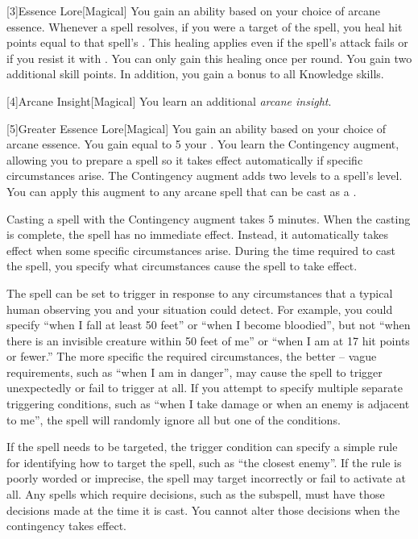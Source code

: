         [3]{Essence Lore}[Magical]
        You gain an ability based on your choice of arcane essence.
         Whenever a spell resolves, if you were a target of the spell, you heal hit points equal to that spell's .
        This healing applies even if the spell's attack fails or if you resist it with .
        You can only gain this healing once per round.
         You gain two additional skill points.
        In addition, you gain a  bonus to all Knowledge skills.

        [4]{Arcane Insight}[Magical]
        You learn an additional \textit{arcane insight}.

        [5]{Greater Essence Lore}[Magical]
        You gain an ability based on your choice of arcane essence.
         You gain  equal to 5 \add your .
         You learn the Contingency augment, allowing you to prepare a spell so it takes effect automatically if specific circumstances arise.
        The Contingency augment adds two levels to a spell's level.
        You can apply this augment to any arcane spell that can be cast as a .

        Casting a spell with the Contingency augment takes 5 minutes.
        When the casting is complete, the spell has no immediate effect.
        Instead, it automatically takes effect when some specific circumstances arise.
        During the time required to cast the spell, you specify what circumstances cause the spell to take effect.

        The spell can be set to trigger in response to any circumstances that a typical human observing you and your situation could detect.
        For example, you could specify ``when I fall at least 50 feet'' or ``when I become bloodied'', but not ``when there is an invisible creature within 50 feet of me'' or ``when I am at 17 hit points or fewer.''
        The more specific the required circumstances, the better -- vague requirements, such as ``when I am in danger'', may cause the spell to trigger unexpectedly or fail to trigger at all.
        If you attempt to specify multiple separate triggering conditions, such as ``when I take damage or when an enemy is adjacent to me'', the spell will randomly ignore all but one of the conditions.

        If the spell needs to be targeted, the trigger condition can specify a simple rule for identifying how to target the spell, such as ``the closest enemy''.
        If the rule is poorly worded or imprecise, the spell may target incorrectly or fail to activate at all.
        Any spells which require decisions, such as the  subspell, must have those decisions made at the time it is cast.
        You cannot alter those decisions when the contingency takes effect.

